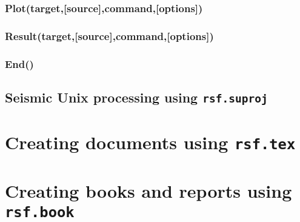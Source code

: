 \subsubsection{Plot(target,[source],command,[options])}
\subsubsection{Result(target,[source],command,[options])}
\subsubsection{End()}

\subsection{Seismic Unix processing using  \texttt{rsf.suproj}}

\section{Creating documents using \texttt{rsf.tex}}

\section{Creating books and reports using \texttt{rsf.book}}



